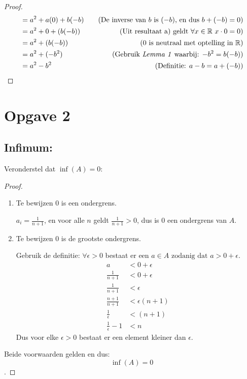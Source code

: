 \documentclass{article}
\newcommand{\f}[2]{\frac{#1}{#2}}
\newcommand{\tx}[1]{\text{#1}}
\newcommand{\R}{\mathbb{R}}
\newcommand{\zdd}{\tx{ zodanig dat }}
\begin{document}
\begin{enumerate}[label=\alph*)]
\begin{proof}
\begin{align*}
            &= a^2 + a(0) + b(-b) &\quad (\tx{De inverse van $b$ is $(-b)$, en dus $b + (-b) = 0$}) \\
            &= a^2 + 0 + (b(-b)) &\quad (\tx{Uit resultaat a) geldt }\forall x \in \R \ x\cdot 0 = 0)\\
            &= a^2 + (b(-b)) &\quad (0 \tx{ is neutraal met optelling in }\R)\\
            &= a^2 + (-b^2)  &\quad (\tx{Gebruik \emph{Lemma 1} waarbij: $-b^2 = b(-b)$}) \\
            &= a^2 - b^2 &\quad (\tx{Definitie: $a-b = a + (-b)$})\\
        \end{align*}
    \end{proof}
\end{enumerate}

\section*{Opgave 2} 

\subsection*{Infimum:}
Veronderstel dat $\inf(A) = 0$:
\begin{proof}
\begin{enumerate}
    \item Te bewijzen $0$ is een ondergrens.

    $a_i = \f{1}{n+1}$, en voor alle $n$ geldt $\f{1}{n+1} > 0$, dus is $0$ een ondergrens van $A$.
    
    \item Te bewijzen $0$ is de grootste ondergrens.

    Gebruik de definitie: $\forall \epsilon > 0$ bestaat er een $a \in A \zdd a > 0 + \epsilon$. 
    \begin{align*}
        a &< 0 + \epsilon \\
    \f{1}{n + 1} &< 0 + \epsilon \\
    \f{1}{n + 1} &< \epsilon \\
    \f{n + 1}{n + 1} &< \epsilon(n + 1) \\
    \f{1}{\epsilon} &< (n + 1) \\
    \f{1}{\epsilon} - 1 &< n
    \end{align*}
    Dus voor elke $\epsilon > 0$ bestaat er een element kleiner dan $\epsilon$.
\end{enumerate}
    Beide voorwaarden gelden en dus: \[\inf(A) = 0\].
\end{proof}
\end{document}
